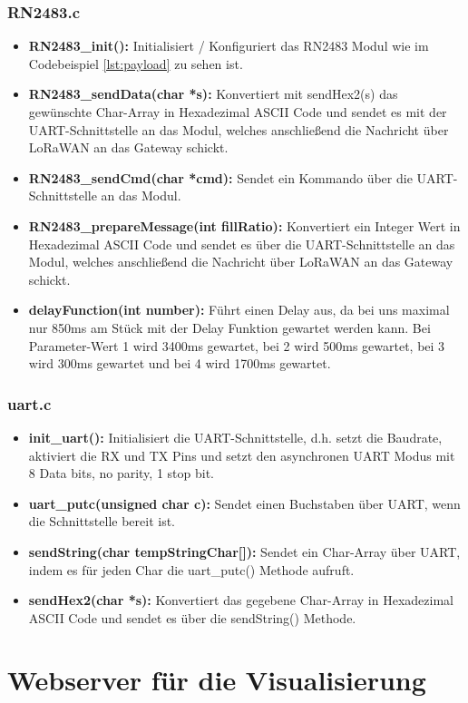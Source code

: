 \subsection{RN2483.c}
\begin{itemize}
    \item \textbf{RN2483\_init():} Initialisiert / Konfiguriert das RN2483 Modul wie im Codebeispiel \ref{lst:payload} zu sehen ist.
    \item \textbf{RN2483\_sendData(char *s):} Konvertiert mit sendHex2(s) das gewünschte Char-Array in Hexadezimal ASCII Code und sendet es mit der UART-Schnittstelle an das Modul, welches anschließend die Nachricht über LoRaWAN an das Gateway schickt.
    \item \textbf{RN2483\_sendCmd(char *cmd):} Sendet ein Kommando über die UART-Schnittstelle an das Modul.
    \item \textbf{RN2483\_prepareMessage(int fillRatio):} Konvertiert ein Integer Wert in Hexadezimal ASCII Code und sendet es über die UART-Schnittstelle an das Modul, welches anschließend die Nachricht über LoRaWAN an das Gateway schickt.
    \item \textbf{delayFunction(int number):} Führt einen Delay aus, da bei uns maximal nur 850ms am Stück mit der Delay Funktion gewartet werden kann. Bei Parameter-Wert 1 wird 3400ms gewartet, bei 2 wird 500ms gewartet, bei 3 wird 300ms gewartet und bei 4 wird 1700ms gewartet. 
\end{itemize}
\subsection{uart.c}
\begin{itemize}
    \item \textbf{init\_uart():} Initialisiert die UART-Schnittstelle, d.h. setzt die Baudrate, aktiviert die RX und TX Pins und setzt den asynchronen UART Modus mit 8 Data bits, no parity, 1 stop bit. 
    \item \textbf{uart\_putc(unsigned char c):} Sendet einen Buchstaben über UART, wenn die Schnittstelle bereit ist.
    \item \textbf{sendString(char tempStringChar[]):} Sendet ein Char-Array über UART, indem es für jeden Char die uart\_putc() Methode aufruft. 
    \item \textbf{sendHex2(char *s):} Konvertiert das gegebene Char-Array in Hexadezimal ASCII Code und sendet es über die sendString() Methode.
\end{itemize}
\newpage
\chapter{Webserver für die Visualisierung}
